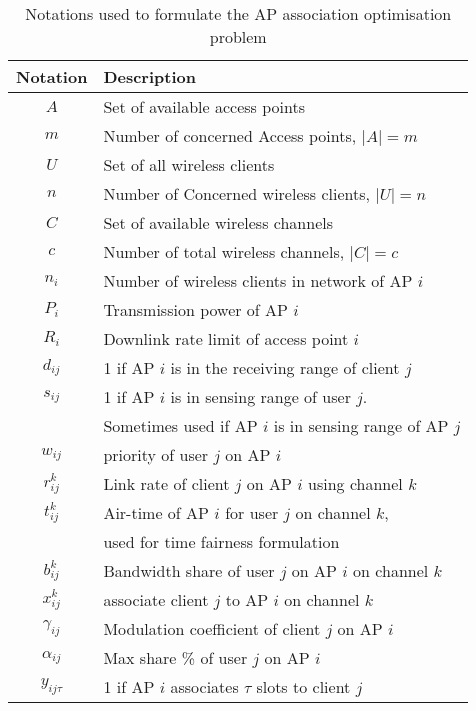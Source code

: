 \documentclass[journal,transmag]{IEEEtran}
\begin{document}
\begin{center} 
\begin{table}[htbp]
\centering
\begin{tabular}{|c|l|} %
\hline
Notation 		& Description \\
\hline
$A$				& Set of available access points\\
$m$				& Number of concerned Access points, $|A|=m$ \\
$U$				& Set of all wireless clients \\
$n$				& Number of Concerned wireless clients, $|U|=n$  \\
$C$ 				& Set of available wireless channels\\
$c$		        & Number of total wireless channels, $|C|=c$  \\
$n_i$			& Number of wireless clients in network of AP $i$\\
$P_i$			& Transmission power of AP $i$ \\
$R_i$			& Downlink rate limit of access point $i$\\
$d_{ij}$			& 1 if AP $i$ is in the receiving range of client $j$ \\
$s_{ij}$			& 1 if AP $i$ is in sensing range of user $j$. \\
				& Sometimes used if AP $i$ is in sensing range of AP $j$\\
$w_{ij}$			& priority of user $j$ on AP $i$ \\			
$r_{ij}^k$ 		& Link rate of client $j$ on AP $i$ using channel $k$\\
$t_{ij}^k$		& Air-time of AP $i$ for user $j$ on channel $k$, \\
				& used for time fairness formulation \\
$b_{ij}^k$		& Bandwidth share of user $j$ on AP $i$ on channel $k$ \\			
$x_{ij}^k$		& associate client $j$ to AP $i$ on channel $k$\\
$\gamma_{ij}$	& Modulation coefficient of client $j$ on AP $i$ \\
$\alpha_{ij}$	& Max share \% of user $j$ on AP $i$ \\
$y_{ij\tau}$	& 1 if AP $i$ associates $\tau$ slots to client $j$ \\

\hline
\end{tabular}
\label{problem_notations}
\caption{Notations used to formulate the AP association optimisation problem}
\end{table}
\end{center}
\end{document}
